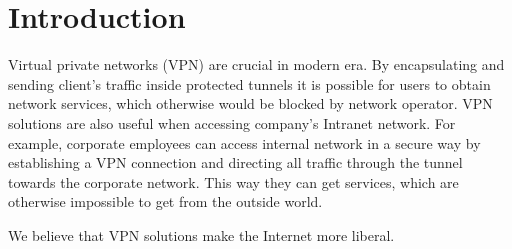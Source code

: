 \section{Introduction}
\label{section:introduction}

Virtual private networks (VPN) are crucial in modern era.
By encapsulating and sending client’s traffic inside protected
tunnels it is possible for users to obtain network services,
which otherwise would be blocked by network operator.
VPN solutions are also useful when accessing company’s Intranet
network. For example, corporate employees can access internal
network in a secure way by establishing a VPN connection and
directing all traffic through the tunnel towards the corporate
network. This way they can get services, which are otherwise
impossible to get from the outside world.

We believe that VPN solutions make the Internet more liberal.